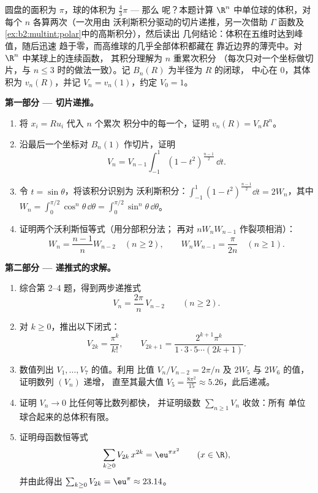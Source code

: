 \begin{problem}[{周末问题 --- $V_n =
\pi^{n/2}/\Gamma(\frac n2 + 1)$，以及高维的
奇异现象}]\label{pb:b2:multint:1}
圆盘的面积为 $\pi$，球的体积为 $\frac43\pi$ --- 那么
呢？本题计算
$\R^n$ 中单位球的体积，对每个 $n$ 各算两次（一次用由
沃利斯积分驱动的切片递推，另一次借助 $\Gamma$ 函数及
\cref{ex:b2:multint:polar}中的高斯积分），然后读出
几何结论：体积在五维时达到峰值，随后迅速
趋于零，而高维球的几乎全部体积都藏在
靠近边界的薄壳中。对 $\R^n$ 中某球上的连续函数，
其积分理解为 $n$ 重累次积分
（每次只对一个坐标做切片，与 $n
\leq 3$ 时的做法一致）。记 $B_n(R)$ 为半径为 $R$ 的闭球，
中心在 $0$，其体积为 $v_n(R)$，并记 $V_n =
v_n(1)$，约定 $V_0 = 1$。

\medskip
\noindent\textbf{第一部分 --- 切片递推。}
\begin{enumerate}
  \item 将 $x_i = Ru_i$ 代入 $n$ 个累次
        积分中的每一个，证明 $v_n(R) = V_nR^n$。
  \item 沿最后一个坐标对 $B_n(1)$ 作切片，证明
        \[
        V_n = V_{n-1}\int_{-1}^{1}(1 -
        t^2)^{\frac{n-1}2}\,\dd t .
        \]
  \item 令 $t = \sin\theta$，将该积分识别为
        沃利斯积分：$\int_{-1}^1(1 -
        t^2)^{\frac{n-1}2}\dd t = 2W_n$，其中 $W_n =
        \int_0^{\pi/2}\cos^n\theta\,\dd\theta =
        \int_0^{\pi/2}\sin^n\theta\,\dd\theta$。
  \item 证明两个沃利斯恒等式（用分部积分法；
        再对 $nW_nW_{n-1}$ 作裂项相消）：
        \[
        W_n = \frac{n-1}nW_{n-2} \quad (n \geq 2),
        \qquad
        W_nW_{n-1} = \frac{\pi}{2n} \quad (n \geq 1).
        \]
\end{enumerate}

\medskip
\noindent\textbf{第二部分 --- 递推式的求解。}
\begin{enumerate}[resume]
  \item 综合第 2--4 题，得到两步递推式
        \[
        V_n = \frac{2\pi}{n}\,V_{n-2}
        \qquad (n \geq 2).
        \]
  \item 对 $k \geq 0$，推出以下闭式：
        \[
        V_{2k} = \frac{\pi^k}{k!},
        \qquad
        V_{2k+1} = \frac{2^{k+1}\pi^k}{1\cdot3\cdot5\cdots
        (2k+1)} .
        \]
  \item 数值列出 $V_1, \dots, V_7$ 的值。利用
        比值 $V_n/V_{n-2} = 2\pi/n$ 及 $2W_5$
        与 $2W_6$ 的值，证明数列 $(V_n)$ 递增，
        直至其最大值 $V_5 = \frac{8\pi^2}{15} \approx
        5.26$，此后递减。
  \item 证明 $V_n \to 0$ 比任何等比数列都快，
        并证明级数 $\sum_{n\geq1} V_n$ 收敛：所有
        单位球合起来的总体积有限。
  \item 证明母函数恒等式
        \[
        \sum_{k\geq0} V_{2k}\,x^{2k} = \eu^{\pi x^2}
        \qquad (x \in \R),
        \]
        并由此得出 $\sum_{k\geq0}V_{2k} = \eu^\pi \approx
        23.14$。
\end{enumerate}


\end{problem}
